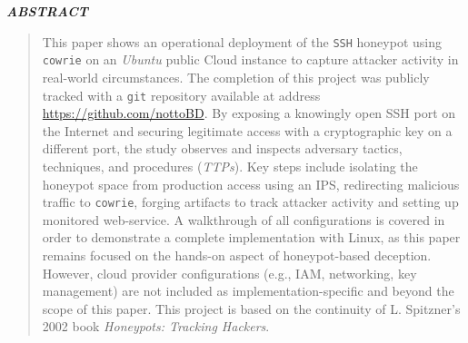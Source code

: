 \documentclass{cls/ULBreport}
\renewenvironment{abstract}{%
  \clearpage
  \thispagestyle{plain}
  \begin{center}
    \bfseries\itshape ABSTRACT
  \end{center}
  \vspace{0.5cm}
  \begin{quote}
    \itshape
    \justifying
}{%
  \end{quote}
  \clearpage
}
\begin{document}
    
    \renewcommand{\rmdefault}{cmr} %
    \renewcommand{\sfdefault}{cmss} %
    \renewcommand{\ttdefault}{cmtt} %
    
    \makeatletter
    \renewcommand{\reset@font}{\normalfont\@setfontsize\f@size{12}{14.4}}
    \makeatother
    \normalfont


    \begin{abstract}        
    This paper shows an operational deployment of the \texttt{SSH} honeypot using \texttt{cowrie} on an \textit{Ubuntu} public Cloud instance to capture attacker activity in real-world circumstances. The completion of this project was publicly tracked with a \texttt{git} repository available at address \href{https://github.com/nottoBD/cloud-honeypot/commits/master/}{https://github.com/nottoBD}. By exposing a knowingly open SSH port on the Internet and securing legitimate access with a cryptographic key on a different port, the study observes and inspects adversary tactics, techniques, and procedures (\textit{TTPs}). Key steps include isolating the honeypot space from production access using an IPS, redirecting malicious traffic to \texttt{cowrie}, forging artifacts to track attacker activity and setting up monitored web-service. A walkthrough of all configurations is covered in order to demonstrate a complete implementation with Linux, as this paper remains focused on the hands-on aspect of honeypot-based deception. However, cloud provider configurations (e.g., IAM, networking, key management) are not included as implementation-specific and beyond the scope of this paper. This project is based on the continuity of L. Spitzner's 2002 book \textit{Honeypots: Tracking Hackers}.
    \end{abstract}
    \newpage


\end{document}

